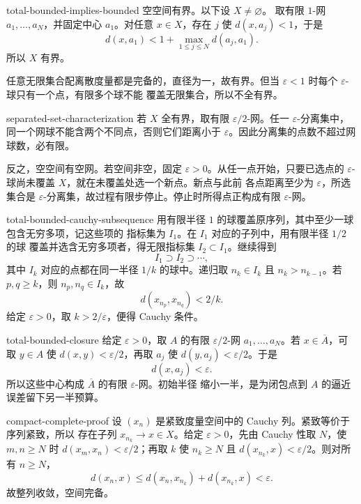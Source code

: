 \begin{solution}{total-bounded-implies-bounded}
空空间有界。以下设 \(X\ne\varnothing\)。
取有限 \(1\)-网 \(a_1,\ldots,a_N\)，并固定中心 \(a_1\)。对任意
\(x\in X\)，存在 \(j\) 使 \(d(x,a_j)<1\)，于是
\[
 d(x,a_1)<1+\max_{1\le j\le N}d(a_j,a_1).
\]
所以 \(X\) 有界。

任意无限集合配离散度量都是完备的，直径为一，故有界。但当
\(\varepsilon<1\) 时每个 \(\varepsilon\)-球只有一个点，有限多个球不能
覆盖无限集合，所以不全有界。
\end{solution}

\begin{solution}{separated-set-characterization}
若 \(X\) 全有界，取有限 \(\varepsilon/2\)-网。任一
\(\varepsilon\)-分离集中，同一个网球不能含两个不同点，否则它们距离小于
\(\varepsilon\)。因此分离集的点数不超过网球数，必有限。

反之，空空间有空网。若空间非空，固定 \(\varepsilon>0\)。从任一点开始，只要已选点的
\(\varepsilon\)-球尚未覆盖 \(X\)，就在未覆盖处选一个新点。新点与此前
各点距离至少为 \(\varepsilon\)，所选集合是
\(\varepsilon\)-分离集，故过程有限步停止。停止时所得点正构成有限
\(\varepsilon\)-网。
\end{solution}

\begin{solution}{total-bounded-cauchy-subsequence}
用有限半径 \(1\) 的球覆盖原序列，其中至少一球包含无穷多项，记这些项的
指标集为 \(I_1\)。在 \(I_1\) 对应的子列中，用有限半径 \(1/2\) 的球
覆盖并选含无穷多项者，得无限指标集
\(I_2\subset I_1\)。继续得到
\[
 I_1\supset I_2\supset\cdots,
\]
其中 \(I_k\) 对应的点都在同一半径 \(1/k\) 的球中。递归取
\(n_k\in I_k\) 且 \(n_k>n_{k-1}\)。若 \(p,q\ge k\)，则
\(n_p,n_q\in I_k\)，故
\[
 d(x_{n_p},x_{n_q})<2/k.
\]
给定 \(\varepsilon>0\)，取 \(k>2/\varepsilon\)，便得 Cauchy 条件。
\end{solution}

\begin{solution}{total-bounded-closure}
给定 \(\varepsilon>0\)，取 \(A\) 的有限 \(\varepsilon/2\)-网
\(a_1,\ldots,a_N\)。若 \(x\in\overline A\)，可取 \(y\in A\) 使
\(d(x,y)<\varepsilon/2\)，再取 \(a_j\) 使
\(d(y,a_j)<\varepsilon/2\)。于是
\[
 d(x,a_j)<\varepsilon.
\]
所以这些中心构成 \(\overline A\) 的有限 \(\varepsilon\)-网。初始半径
缩小一半，是为闭包点到 \(A\) 的逼近误差留下另一半预算。
\end{solution}

\begin{solution}{compact-complete-proof}
设 \((x_n)\) 是紧致度量空间中的 Cauchy 列。紧致等价于序列紧致，所以
存在子列 \(x_{n_k}\to x\in X\)。给定 \(\varepsilon>0\)，先由 Cauchy
性取 \(N\)，使 \(m,n\ge N\) 时
\(d(x_m,x_n)<\varepsilon/2\)；再取 \(k\) 使 \(n_k\ge N\) 且
\(d(x_{n_k},x)<\varepsilon/2\)。则对所有 \(n\ge N\)，
\[
 d(x_n,x)\le d(x_n,x_{n_k})+d(x_{n_k},x)<\varepsilon.
\]
故整列收敛，空间完备。
\end{solution}

